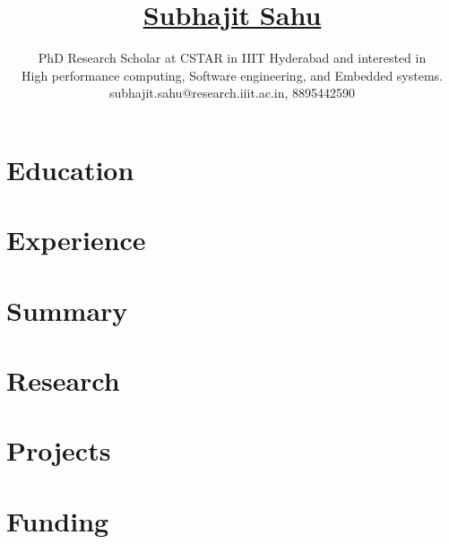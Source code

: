 \documentclass[11pt]{article}
\title{
  \vspace{-6ex}
  \href{https://wolfram77.github.io/}{Subhajit Sahu}
  \vspace{-4ex}
}
\author{
  PhD Research Scholar at CSTAR in IIIT Hyderabad and interested in \\
  High performance computing, Software engineering, and Embedded systems. \\
  {\small subhajit.sahu@research.iiit.ac.in, 8895442590} \\
}
\date{}
\begin{document}
\maketitle
\vspace{-9ex}

\section{Education}


\section{Experience}


\section{Summary}


\section{Research}


\section{Projects}


\section{Funding}

\end{document}
